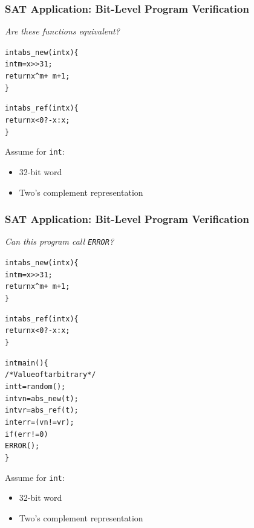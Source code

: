 \documentclass[t,pdf]{beamer}
\newenvironment{ccode}{\begin{alltt}\footnotesize}{\end{alltt}}
\begin{document}
\begin{frame}[fragile]
  \frametitle{SAT Application: Bit-Level Program Verification}
{\large \em  \textcolor{xblue}{Are these functions equivalent?}}\\
\medskip

\begin{minipage}[t]{0.48\textwidth}
\begin{ccode}
int abs_new(int x) \verb:{:
  int m = x>>31;
  return x^m + ~m + 1;
\verb:}:

int abs_ref(int x) \verb:{:
  return x < 0 ? -x : x;
\verb:}:    
\end{ccode}
\end{minipage}
\begin{minipage}[t]{0.48\textwidth}
\begin{ccode}
\end{ccode}
\end{minipage}

\medskip
Assume for {\tt int}:
  \begin{itemize}
  \item 32-bit word
  \item Two's complement representation
  \end{itemize}
\end{frame}

\begin{frame}[fragile]
  \frametitle{SAT Application: Bit-Level Program Verification}
{\large \em \textcolor{xblue}{Can this program call \texttt{ERROR}?}}\\

\medskip
\begin{minipage}[t]{0.48\textwidth}
\begin{ccode}
int abs_new(int x) \verb:{:
  int m = x>>31;
  return x^m + ~m + 1;
\verb:}:

int abs_ref(int x) \verb:{:
  return x < 0 ? -x : x;
\verb:}:    
\end{ccode}
\end{minipage}
\begin{minipage}[t]{0.48\textwidth}
\begin{ccode}
int main() \verb:{:
  /* Value of t arbitrary */
  int t = random();
  int vn = abs_new(t);
  int vr = abs_ref(t);
  int err = (vn != vr);
  if (err != 0)
    ERROR();
\verb:}:
\end{ccode}
\end{minipage}

Assume for {\tt int}:
  \begin{itemize}
  \item 32-bit word
  \item Two's complement representation
  \end{itemize}


\end{frame}
\end{document}
